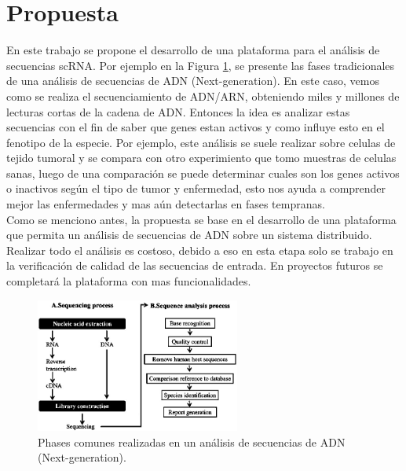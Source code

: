 \section{Propuesta}
En este trabajo se propone el desarrollo de una plataforma para el análisis de secuencias scRNA.  Por ejemplo en la Figura \ref{fig:analysis}, se presente las fases tradicionales de una análisis de secuencias de ADN (Next-generation). En este caso, vemos como se realiza el secuenciamiento de ADN/ARN, obteniendo miles y millones de lecturas cortas de la cadena de ADN. Entonces la idea es analizar estas secuencias con el fin de  saber que genes estan activos y como influye esto en el fenotipo de la especie. Por ejemplo, este análisis se suele realizar sobre celulas de tejido tumoral y se compara con otro experimiento que tomo muestras de celulas sanas, luego de una comparación se puede determinar cuales son los genes activos o inactivos según el tipo de tumor y enfermedad, esto nos ayuda a comprender mejor las enfermedades y mas aún detectarlas en fases tempranas. \\

Como se menciono antes, la propuesta se base en el desarrollo de una plataforma que permita un análisis de secuencias de ADN sobre un sistema distribuido. Realizar todo el análisis es costoso, debido a eso en esta etapa solo se trabajo en la verificación de calidad de las secuencias de entrada. En proyectos futuros se completará la plataforma con mas funcionalidades.

\begin{figure}[H]
    \centering
    \includegraphics[width=0.6\textwidth]{img/analysis2}
    \caption{Phases comunes realizadas en un análisis de secuencias de ADN (Next-generation).}
    \label{fig:analysis}
\end{figure}
